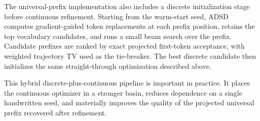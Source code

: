 The universal-prefix implementation also includes a discrete initialization
stage before continuous refinement. Starting from the warm-start seed, ADSD
computes gradient-guided token replacements at each prefix position, retains
the top vocabulary candidates, and runs a small beam search over the prefix.
Candidate prefixes are ranked by exact projected first-token acceptance, with
weighted trajectory TV used as the tie-breaker. The best discrete candidate
then initializes the same straight-through optimization described above.

This hybrid discrete-plus-continuous pipeline is important in practice. It
places the continuous optimizer in a stronger basin, reduces dependence on a
single handwritten seed, and materially improves the quality of the projected
universal prefix recovered after refinement.
